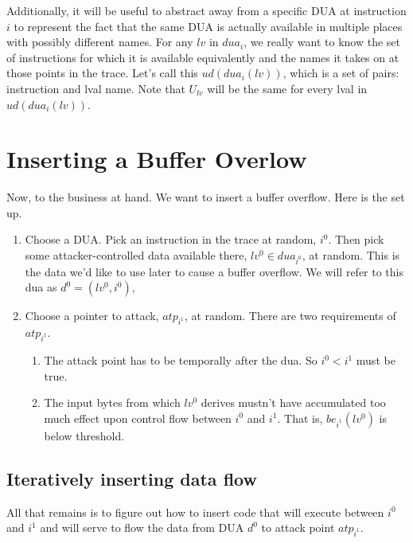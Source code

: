 \documentclass{article}
\begin{document}
Additionally, it will be useful to abstract away from a specific DUA at instruction $i$ to represent the fact that the same DUA is actually available in multiple places with possibly different names. For any $lv$ in $dua_i$, we really want to know the set of instructions for which it is available equivalently and the names it takes on at those points in the trace.  Let's call this $ud(dua_{i}(lv))$, which is a set of pairs: instruction and lval name.  Note that $U_{lv}$ will be the same for every lval in $ud(dua_{i}(lv))$.


\section{Inserting a Buffer Overlow}

Now, to the business at hand.  We want to insert a buffer overflow.  Here is the set up.  

\begin{enumerate}

\item Choose a DUA.  Pick an instruction in the trace at random, $i^{0}$.  Then pick some attacker-controlled data available there, $lv^{0} \in dua_{i^0}$, at random. This is the data we'd like to use later to cause a buffer overflow.  We will refer to this dua as $d^{0} = (lv^{0},i^{0})$,

\item Choose a pointer to attack, $atp_{i^1}$, at random.  There are two requirements of $atp_{i^1}$.

\begin{enumerate}
\item The attack point has to be temporally after the dua.  So $i^0<i^1$ must be true.
\item The input bytes from which  $lv^0$ derives mustn't have accumulated too much effect upon control flow between $i^0$ and $i^1$.  That is, $be_{i^1}(lv^0)$ is below threshold.  
\end{enumerate}
\end{enumerate}

\subsection {Iteratively inserting data flow}

All that remains is to figure out how to insert code that will execute between $i^0$ and $i^1$ and will serve to flow the data from DUA $d^{0}$ to attack point $atp_{i^1}$.  
\end{document}
